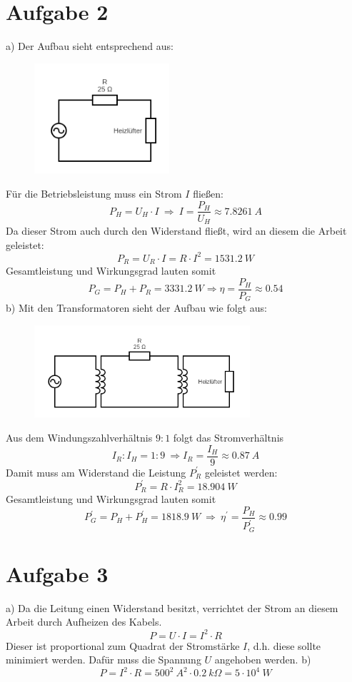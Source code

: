 \documentclass[11pt a4paper]{article}
\begin{document}
\section*{Aufgabe 2}
a) Der Aufbau sieht entsprechend aus:
\begin{figure}[H]
	\centering
	\includegraphics[width = 5cm]{figures/aufgabe2-1.png}
\end{figure}
\noindent
Für die Betriebsleistung muss ein Strom $I$ fließen:
\[ P_H = U_H \cdot I \ \Rightarrow \ I = \frac{P_H}{U_H} \approx 7.8261 \ A \]
Da dieser Strom auch durch den Widerstand fließt, wird an diesem die Arbeit geleistet:
\[ P_R = U_R \cdot I = R \cdot I^2 = 1531.2 \ W \]
Gesamtleistung und Wirkungsgrad lauten somit
\[ 
	P_G = P_H + P_R = 3331.2 \ W
	\Rightarrow
	\eta = \frac{P_H}{P_G} \approx 0.54
\]
b) Mit den Transformatoren sieht der Aufbau wie folgt aus:
\begin{figure}[H]
	\centering
	\includegraphics[width = 8cm]{figures/aufgabe2-2.png}
\end{figure}
\noindent
Aus dem Windungszahlverhältnis $9:1$ folgt das Stromverhältnis 
\[ I_R : I_H = 1 : 9 \ \Rightarrow I_R = \frac{I_H}{9} \approx 0.87 \ A \]
Damit muss am Widerstand die Leistung $P_R^\prime$ geleistet werden:
\[ P_R^\prime = R \cdot I_R^2 = 18.904 \ W \]
Gesamtleistung und Wirkungsgrad lauten somit
\[ 
	P_G^\prime = P_H + P_H^\prime = 1818.9 \ W
	\ \Rightarrow \
	\eta^\prime = \frac{P_H}{P_G^\prime} \approx 0.99
\]

\newpage

\section*{Aufgabe 3}
a) Da die Leitung einen Widerstand besitzt, verrichtet der Strom an diesem Arbeit durch Aufheizen des Kabels.
\[ P = U \cdot I = I^2 \cdot R \]
Dieser ist proportional zum Quadrat der Stromstärke $I$, d.h. diese sollte minimiert werden. Dafür muss die 
Spannung $U$ angehoben werden.
\newline
b)
\[
	P = I^2 \cdot R = 500^2 \ A^2 \cdot 0.2 \ k\Omega = 5 \cdot 10^4 \ W
\]
\end{document}
